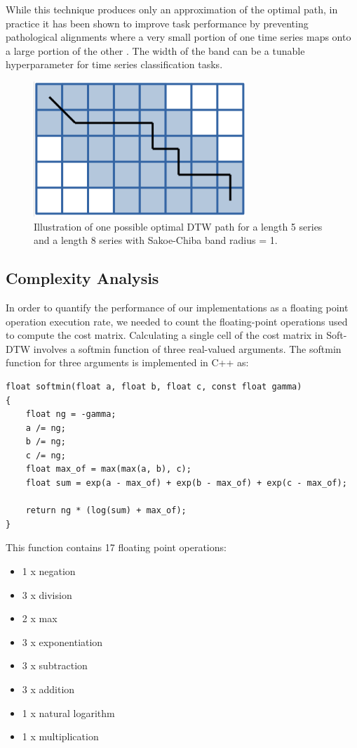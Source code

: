\documentclass[12pt, letterpaper]{article}
\begin{document}
While this technique produces only an approximation of the optimal path, in
practice it has been shown to improve task performance by preventing
pathological alignments where a very small portion of one time series maps onto
a large portion of the other \cite{keogh_exact_2002}. The width of the band
can be a tunable hyperparameter for time series classification tasks.

\begin{figure}[htbp]
\includegraphics[height=2in]{img/sakoe_chiba.png}
\centering
\caption{Illustration of one possible optimal DTW path for a length 5 series and
a length 8 series with Sakoe-Chiba band radius = 1.}
\label{sakoe_chiba}
\end{figure}

\subsection{Complexity Analysis}

In order to quantify the performance of our implementations as a floating point
operation execution rate, we needed to count the floating-point operations used
to compute the cost matrix. Calculating a single cell of the cost matrix in
Soft-DTW involves a softmin function of three real-valued arguments. The softmin
function for three arguments is implemented in C++ as:

\begin{verbatim}
float softmin(float a, float b, float c, const float gamma)
{
    float ng = -gamma;
    a /= ng;
    b /= ng;
    c /= ng;
    float max_of = max(max(a, b), c);
    float sum = exp(a - max_of) + exp(b - max_of) + exp(c - max_of);

    return ng * (log(sum) + max_of);
}
\end{verbatim}

This function contains 17 floating point operations:

\begin{itemize}
  \item 1 x negation
  \item 3 x division
  \item 2 x max
  \item 3 x exponentiation
  \item 3 x subtraction
  \item 3 x addition
  \item 1 x natural logarithm
  \item 1 x multiplication
\end{itemize}
\end{document}
